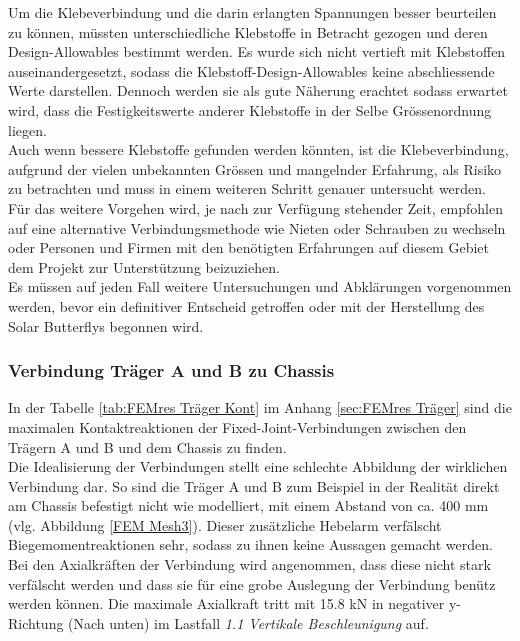 Um die Klebeverbindung und die darin erlangten Spannungen besser beurteilen zu können, müssten unterschiedliche Klebstoffe in Betracht gezogen und deren Design-Allowables bestimmt werden. Es wurde sich nicht vertieft mit Klebstoffen auseinandergesetzt, sodass die Klebstoff-Design-Allowables keine abschliessende Werte darstellen. Dennoch werden sie als gute Näherung erachtet sodass erwartet wird, dass die Festigkeitswerte anderer Klebstoffe in der Selbe Grössenordnung liegen.\\
Auch wenn bessere Klebstoffe gefunden werden könnten, ist die Klebeverbindung, aufgrund der vielen unbekannten Grössen und mangelnder Erfahrung, als Risiko zu betrachten und muss in einem weiteren Schritt genauer untersucht werden. Für das weitere Vorgehen wird, je nach zur Verfügung stehender Zeit, empfohlen auf eine alternative Verbindungsmethode wie Nieten oder Schrauben zu wechseln oder Personen und Firmen mit den benötigten Erfahrungen auf diesem Gebiet dem Projekt zur Unterstützung beizuziehen.\\
Es müssen auf jeden Fall weitere Untersuchungen und Abklärungen vorgenommen werden, bevor ein definitiver Entscheid getroffen oder mit der Herstellung des Solar Butterflys begonnen wird.

\subsubsection{Verbindung Träger A und B zu Chassis}
In der Tabelle \ref{tab:FEMres Träger Kont} im Anhang \ref{sec:FEMres Träger} sind die maximalen Kontaktreaktionen der Fixed-Joint-Verbindungen zwischen den Trägern A und B und dem Chassis zu finden.\\
Die Idealisierung der Verbindungen stellt eine schlechte Abbildung der wirklichen Verbindung dar. So sind die Träger A und B zum Beispiel in der Realität direkt am Chassis befestigt nicht wie modelliert, mit einem Abstand von ca. 400 mm (vlg. Abbildung \ref{FEM Mesh3}). Dieser zusätzliche Hebelarm verfälscht Biegemomentreaktionen sehr, sodass zu ihnen keine Aussagen gemacht werden.\\
Bei den Axialkräften der Verbindung wird angenommen, dass diese nicht stark verfälscht werden und dass sie für eine grobe Auslegung der Verbindung benütz werden können. Die maximale Axialkraft tritt mit 15.8 kN in negativer y-Richtung (Nach unten) im Lastfall \emph{1.1 Vertikale Beschleunigung} auf.


